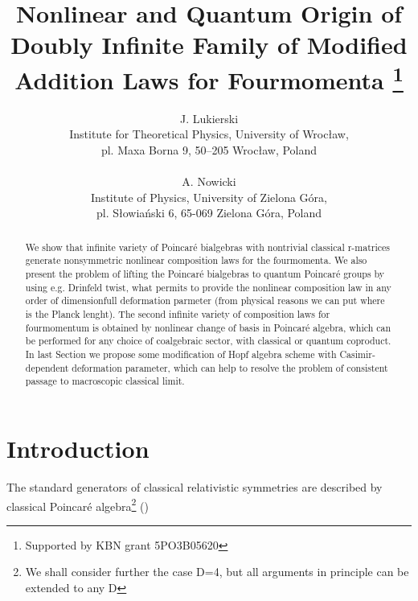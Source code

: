 \documentclass[a4paper,a4paper]{article}
\begin{document}
\title{Nonlinear and Quantum Origin of Doubly Infinite Family of 
Modified Addition Laws for 
Fourmomenta
\thanks{Supported by KBN grant 5PO3B05620}}
\author{J. Lukierski
\\
Institute for Theoretical Physics, University of Wroc{\l}aw,
 \\
 pl. Maxa Borna 9, 50--205 Wroc{\l}aw, Poland
 \\ \\
A. Nowicki
\\
Institute of Physics, University of Zielona G\'{o}ra,
 \\
 pl. S\l owia\'{n}ski 6, 65-069 Zielona G\'{o}ra, Poland}
\maketitle
\begin{abstract}
We show that infinite variety of Poincar\'{e} bialgebras with
nontrivial classical r-matrices generate nonsymmetric nonlinear
composition laws for the fourmomenta. We also present the 
problem
of lifting the Poincar\'{e} bialgebras to quantum Poincar\'{e}
groups by using e.g. Drinfeld twist, what permits to provide the
nonlinear composition law in any order of dimensionfull
deformation parmeter \myHighlight{$\lambda$}\coordHE{} (from physical reasons we can put
\coordHE{} where \coordHE{} is the Planck
lenght). The second infinite variety of composition laws for
fourmomentum is obtained by nonlinear change of basis in
Poincar\'{e} algebra, which can be performed for any choice of
coalgebraic sector, with classical or quantum coproduct. In last
Section we propose some modification of Hopf algebra scheme with
Casimir-dependent deformation parameter, which can help to 
resolve
the problem of consistent passage to macroscopic classical limit.








\end{abstract}
\section{Introduction}

\renewcommand{\theequation}{\thesection.\arabic{equation}}

The standard generators of classical relativistic symmetries are
described by classical Poincar\'{e} algebra\footnote{We shall
consider further the case D=4, but all arguments in principle can
be extended to any D } (\coordHE{})
\end{document}
